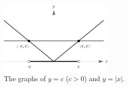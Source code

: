 \begin{figure}[H]
	\begin{center}
			\includegraphics[width=0.5\textwidth]{fig_functions_34}
	\caption{The graphs of $y=c$ ($c>0$) and $y=|x|$.}
	\label{fig_functions_34}
	\end{center}
\end{figure}


\ifvc
\ifcalculus
